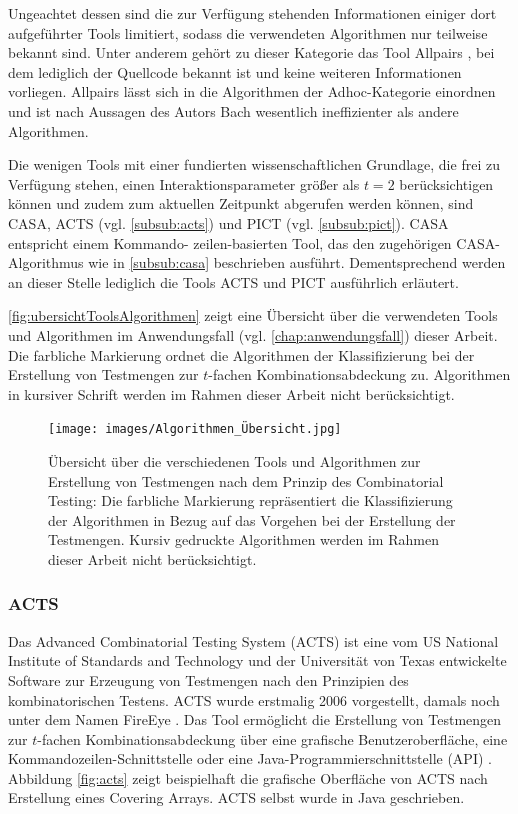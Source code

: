 Ungeachtet dessen sind die zur Verfügung stehenden Informationen einiger dort aufgeführter Tools limitiert, sodass die verwendeten Algorithmen nur teilweise bekannt sind. Unter anderem gehört zu dieser Kategorie das Tool Allpairs \cite{bach2012allpairs}, bei dem lediglich der Quellcode bekannt ist und keine weiteren Informationen vorliegen. Allpairs lässt sich in die Algorithmen der Adhoc-Kategorie einordnen und ist nach Aussagen des Autors Bach \cite{bach2012allpairs} wesentlich ineffizienter als andere Algorithmen.

Die wenigen Tools mit einer fundierten wissenschaftlichen Grundlage, die frei zu Verfügung stehen, einen Interaktionsparameter größer als $t=2$ berücksichtigen können und zudem zum aktuellen Zeitpunkt abgerufen werden können, sind CASA, ACTS (vgl. \autoref{subsub:acts}) und PICT (vgl. \autoref{subsub:pict}). CASA entspricht einem Kommando- zeilen-basierten Tool, das den zugehörigen CASA-Algorithmus wie in \autoref{subsub:casa} beschrieben ausführt. Dementsprechend werden an dieser Stelle lediglich die Tools ACTS und PICT ausführlich erläutert.

\autoref{fig:ubersichtToolsAlgorithmen} zeigt eine Übersicht über die verwendeten Tools und Algorithmen im Anwendungsfall (vgl. \autoref{chap:anwendungsfall}) dieser Arbeit. Die farbliche Markierung ordnet die Algorithmen der Klassifizierung bei der Erstellung von Testmengen zur $t$-fachen Kombinationsabdeckung zu. Algorithmen in kursiver Schrift werden im Rahmen dieser Arbeit nicht berücksichtigt.

\begin{figure}[!htb]
\centering
\texttt{[image: images/Algorithmen\_Übersicht.jpg]}
\caption{Übersicht über die verschiedenen Tools und Algorithmen zur Erstellung von Testmengen nach dem Prinzip des Combinatorial Testing: Die farbliche Markierung repräsentiert die Klassifizierung der Algorithmen in Bezug auf das Vorgehen bei der Erstellung der Testmengen. Kursiv gedruckte Algorithmen werden im Rahmen dieser Arbeit nicht berücksichtigt.}
\label{fig:ubersichtToolsAlgorithmen}
\end{figure}

\subsubsection{ACTS}\label{subsub:acts}

Das \glqq Advanced Combinatorial Testing System\grqq{} (ACTS) \cite{yu2013acts} ist eine vom US National Institute of Standards and Technology und der Universität von Texas entwickelte Software zur Erzeugung von Testmengen nach den Prinzipien des kombinatorischen Testens. ACTS wurde erstmalig 2006 vorgestellt, damals noch unter dem Namen FireEye \cite{lei2007ipog}. Das Tool ermöglicht die Erstellung von Testmengen zur $t$-fachen Kombinationsabdeckung über eine grafische Benutzeroberfläche, eine Kommandozeilen-Schnittstelle oder eine Java-Programmierschnittstelle (API) \cite{yu2013acts}. Abbildung \ref{fig:acts} zeigt beispielhaft die grafische Oberfläche von ACTS nach Erstellung eines Covering Arrays. ACTS selbst wurde in Java geschrieben.

